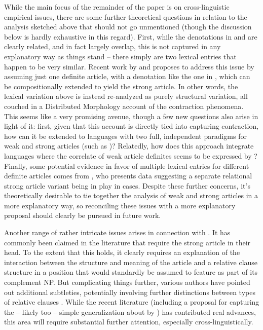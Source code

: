 \documentclass[output=paper
,modfonts
,nonflat]{langscibook}
\begin{document}
While the main focus of the remainder of the paper is on
cross-linguistic empirical issues, there are some further theoretical
questions in relation to the analysis sketched above that should not go
unmentioned (though the discussion below is hardly exhaustive in this
regard). First, while the denotations in  and
 are clearly related, and in fact largely overlap,
this is not captured in any explanatory way as things stand -- there
simply are two lexical entries that happen to be very
similar. Recent work by \citet{Hanink2016} and \citet{Hanink2015}
proposes to address this issue by assuming just one definite article,
with a denotation like the one in , which can be
compositionally extended to yield the strong article. In other words,
the lexical variation above is instead re-analyzed as purely
structural variation, all couched in a Distributed Morphology account
of the contraction phenomena. This seems like a very promising avenue,
though a few new questions also arise in light of it: first, given
that this account is directly tied into capturing contraction, how can
it be extended to languages with two full, independent paradigms for
weak and strong articles (such as )? Relatedly, how does this
approach integrate languages where the correlate of weak article 
definites seems to be expressed by ? Finally, some potential
evidence in favor of multiple lexical entries for different definite
articles comes from \citet{Grubic2016}, who presents data suggesting a
separate relational strong article variant being in play in 
cases. Despite these further concerns, it's theoretically desirable to tie
together the analysis of weak and strong articles in a more
explanatory way, so reconciling these issues with a more explanatory
proposal should clearly be pursued in future work.

Another range of rather intricate issues arises in connection with
. It has commonly been claimed in the literature that  require the strong article in their
head. To the extent that this holds, it clearly requires an
explanation of the interaction between the structure and meaning of
the article and a relative clause structure in a position that would
standardly be assumed to feature as part of its complement NP. But
complicating things further, various authors have pointed out
additional subtleties, potentially involving further distinctions
between types of relative clauses \citep[see,
a.o.][]{Hofherr2013,Wiltschko2013,Simonenko2014}. While the recent
literature (including a proposal for capturing the -- likely too --
simple generalization about  by
\citealt{Hanink2016}) has contributed real advances, this
area will require substantial further attention, especially cross-linguistically.
\end{document}
